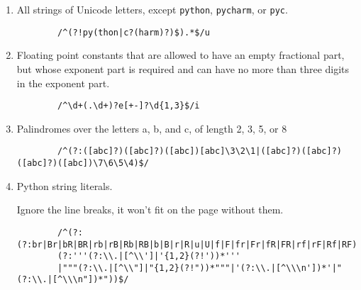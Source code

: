 \documentclass{article}
\begin{document}
\begin{enumerate}[label=(\alph*)]
\begin{shaded}
      \begin{verbatim}
        /^([89]|[12]\d|3[0-2])$/
      \end{verbatim}
    \end{shaded}
  \item All strings of Unicode letters, except \verb+python+, \verb+pycharm+, or \verb+pyc+.
    \begin{shaded}
      \begin{verbatim}
        /^(?!py(thon|c?(harm)?)$).*$/u
      \end{verbatim}
    \end{shaded}
    \item Floating point constants that are allowed to have an empty fractional part, but whose exponent part is required and can have no more than three digits in the exponent part.
    \begin{shaded}
      \begin{verbatim}
        /^\d+(.\d+)?e[+-]?\d{1,3}$/i
      \end{verbatim}
    \end{shaded}
    \item Palindromes over the letters a, b, and c, of length 2, 3, 5, or 8
    \begin{shaded}
      \begin{verbatim}
        /^(?:([abc]?)([abc]?)([abc])[abc]\3\2\1|([abc]?)([abc]?)([abc]?)([abc])\7\6\5\4)$/
      \end{verbatim}
    \end{shaded}
    \item Python string literals.
    \begin{shaded}
      Ignore the line breaks, it won't fit on the page without them.
      \begin{verbatim}
        /^(?:(?:br|Br|bR|BR|rb|rB|Rb|RB|b|B|r|R|u|U|f|F|fr|Fr|fR|FR|rf|rF|Rf|RF)?
        (?:'''(?:\\.|[^\\']|'{1,2}(?!'))*'''
        |"""(?:\\.|[^\\"]|"{1,2}(?!"))*"""|'(?:\\.|[^\\\n'])*'|"(?:\\.|[^\\\n"])*"))$/
      \end{verbatim}
    \end{shaded}
\end{enumerate}
\end{document}
